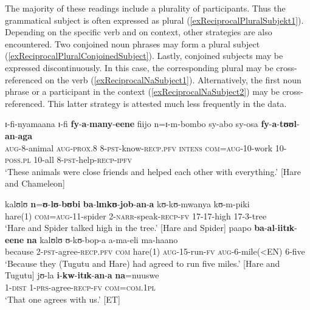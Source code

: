 \protect{}

The majority of these readings include a plurality of participants. Thus the grammatical subject is often expressed as plural (\ref{exReciprocalPluralSubjekt1}).
Depending on the specific verb and on context, other strategies are also encountered. Two conjoined noun phrases may form a plural subject (\ref{exReciprocalPluralConjoinedSubject}). Lastly, conjoined subjects may be expressed discontinuously. In this case, the corresponding plural may be cross-referenced on the verb (\ref{exReciprocalNaSubject1}).
Alternatively, the first noun phrase or a participant in the context (\ref{exReciprocalNaSubject2}) may be cross-referenced. This latter strategy is attested much less frequently in the data.

\begin{exe}
	\ex\label{exReciprocalPluralSubjekt1}
	\gll ɪ-fi-nyamaana ɪ-fi \textbf{fy}-\textbf{a}-\textbf{many}-\textbf{eene} fiijo n=ɪ-m-bombo sy-abo sy-osa \textbf{fy}-\textbf{a}-\textbf{tʊʊl}-\textbf{an}-\textbf{aga}\\
	\textsc{aug}-8-animal \textsc{aug}-\textsc{prox.8} 8-\textsc{pst}-know-\textsc{recp.pfv} \textsc{intens} \textsc{com}=\textsc{aug}-10-work 10-\textsc{poss.pl} 10-all 8-\textsc{pst}-help-\textsc{recp}-\textsc{ipfv}\\
	
	\glt \lq These animals were close friends and helped each other with everything.' [Hare and Chameleon]
	
	
	\ex\label{exReciprocalPluralConjoinedSubject}
	\gll kalʊlʊ \textbf{n}=\textbf{ʊ}-\textbf{lʊ}-\textbf{bʊbi} \textbf{ba}-\textbf{lɪnkʊ}-\textbf{job}-\textbf{an}-\textbf{a} kʊ-kʊ-mwanya kʊ-m-piki\\
	hare(1) \textsc{com}=\textsc{aug}-11-spider 2-\textsc{narr}-speak-\textsc{recp}-\textsc{fv} 17-17-high 17-3-tree\\
	\glt \lq Hare and Spider talked high in the tree.' [Hare and Spider]
	\ex\label{exReciprocalNaSubject1} \gll paapo \textbf{ba}-\textbf{al}-\textbf{iitɪk}-\textbf{eene} \textbf{na} kalʊlʊ ʊ-kʊ-bop-a a-ma-eli ma-haano\\
	because 2-\textsc{pst}-agree-\textsc{recp.pfv} \textsc{com} hare(1) \textsc{aug}-15-run-\textsc{fv} \textsc{aug}-6-mile(<EN) 6-five\\
	\glt \lq Because they (Tugutu and Hare) had agreed to run five miles.' [Hare and Tugutu]
	\ex\label{exReciprocalNaSubject2}
	\gll jʊ-la \textbf{i}-\textbf{kw}-\textbf{itɪk}-\textbf{an}-\textbf{a} \textbf{na}=nuuswe\\
	1-\textsc{dist} 1-\textsc{prs}-agree-\textsc{recp}-\textsc{fv} \textsc{com}=\textsc{com.1pl}\\
	\glt \lq That one agrees with us.' [ET]
\end{exe}
